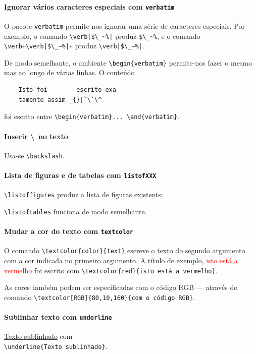 \documentclass[11pt]{article}
\begin{document}
\paragraph{Ignorar vários caracteres especiais com \texttt{verbatim}}
O pacote \texttt{verbatim} permite-nos ignorar uma série de caracteres especiais.
Por exemplo, o comando \verb+\verb|$\_~%|+ produz \verb|$\_~%|, e o comando
\verb-\verb+\verb|$\_~%|+- produz \verb+\verb|$\_~%|+.

De modo semelhante, o ambiente \verb|\begin{verbatim}| permite-nos fazer o mesmo
mas ao longo de várias linhas. O conteúdo
\begin{verbatim}
    Isto foi        escrito exa
    tamente assim _{}|`\`\^
\end{verbatim}
foi escrito entre \verb|\begin{verbatim}... \end{verbatim}|.

\paragraph{Inserir \textbackslash~no texto}
Usa-se \verb|\backslash|.

\paragraph{Lista de figuras e de tabelas com \texttt{listofXXX}}
\verb|\listoffigures| produz a lista de figuras existents:

\listoffigures

\verb|\listoftables| funciona de modo semelhante.

\paragraph{Mudar a cor do texto com \texttt{textcolor}}
O comando \verb|\textcolor{color}{text}| escreve o texto do segundo
argumento com a cor indicada no primeiro argumento.
A título de exemplo, \textcolor{red}{isto está a vermelho} foi escrito com
\verb|\textcolor{red}{isto está a vermelho}|.

As cores também podem ser especificadas
\textcolor[RGB]{80,10,160}{com o código RGB} --- através do comando
\verb|\textcolor[RGB]{80,10,160}{com o código RGB}|.

\paragraph{Sublinhar texto com \texttt{underline}}
\underline{Texto sublinhado} com \\
\verb|\underline{Texto sublinhado}|.
\end{document}
